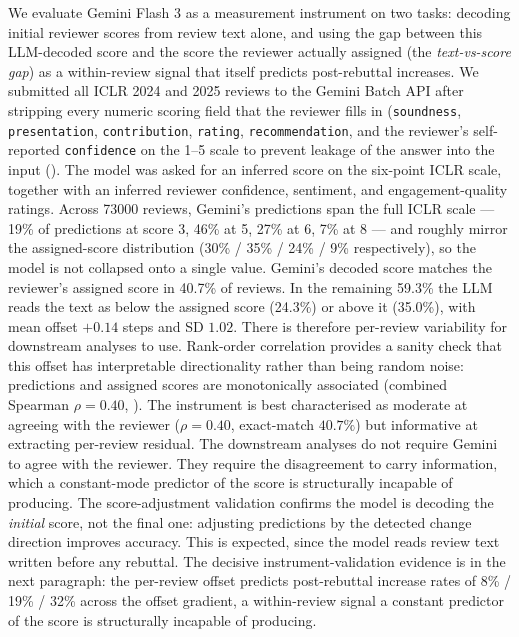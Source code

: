\documentclass{article}
\newcommand{\code}[1]{\texttt{#1}}
\begin{document}
We evaluate Gemini Flash 3 as a measurement instrument on two tasks: decoding initial reviewer scores from review text alone, and using the gap between this LLM-decoded score and the score the reviewer actually assigned (the \emph{text-vs-score gap}) as a within-review signal that itself predicts post-rebuttal increases. We submitted all ICLR 2024 and 2025 reviews to the Gemini Batch API after stripping every numeric scoring field that the reviewer fills in (\code{soundness}, \code{presentation}, \code{contribution}, \code{rating}, \code{recommendation}, and the reviewer's self-reported \code{confidence} on the 1--5 scale to prevent leakage of the answer into the input (). The model was asked for an inferred score on the six-point ICLR scale, together with an inferred reviewer confidence, sentiment, and engagement-quality ratings. Across \num{73000} reviews, Gemini's predictions span the full ICLR scale --- 19\% of predictions at score 3, 46\% at 5, 27\% at 6, 7\% at 8 --- and roughly mirror the assigned-score distribution (30\% / 35\% / 24\% / 9\% respectively), so the model is not collapsed onto a single value. Gemini's decoded score matches the reviewer's assigned score in 40.7\% of reviews. In the remaining 59.3\% the LLM reads the text as below the assigned score (24.3\%) or above it (35.0\%), with mean offset $+0.14$ steps and SD $1.02$. There is therefore per-review variability for downstream analyses to use. Rank-order correlation provides a sanity check that this offset has interpretable directionality rather than being random noise: predictions and assigned scores are monotonically associated (combined Spearman $\rho = 0.40$, ). The instrument is best characterised as moderate at agreeing with the reviewer ($\rho = 0.40$, exact-match $40.7\%$) but informative at extracting per-review residual. The downstream analyses do not require Gemini to agree with the reviewer. They require the disagreement to carry information, which a constant-mode predictor of the score is structurally incapable of producing. The score-adjustment validation confirms the model is decoding the \emph{initial} score, not the final one: adjusting predictions by the detected change direction improves accuracy. This is expected, since the model reads review text written before any rebuttal. The decisive instrument-validation evidence is in the next paragraph: the per-review offset predicts post-rebuttal increase rates of 8\% / 19\% / 32\% across the offset gradient, a within-review signal a constant predictor of the score is structurally incapable of producing.
\end{document}

